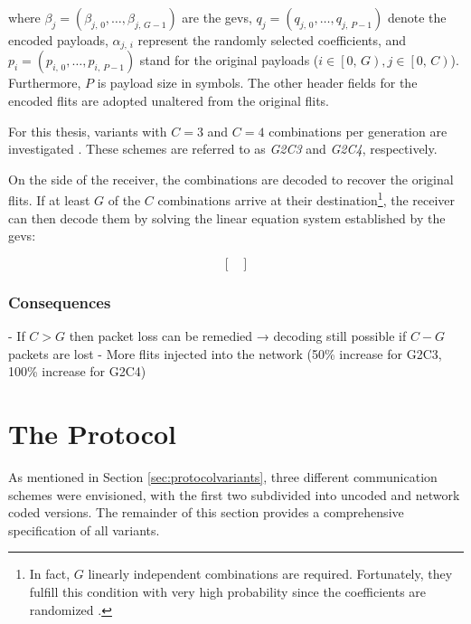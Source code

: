 where $\beta_j = (\beta_{j,\,0}, …, \beta_{j,\,G-1})$ are the \glspl{gev}, $q_j = (q_{j,\,0}, …, q_{j,\,P-1})$ denote the encoded payloads,
$\alpha_{j,\,i}$ represent the randomly selected coefficients, and $p_i = (p_{i,\,0}, …, p_{i,\,P-1})$ stand for the original payloads
($i \in \left[0,\,G\right), j \in \left[0,\,C\right)$). Furthermore, $P$ is payload size in symbols.%
The other header fields for the encoded flits are adopted unaltered from the original flits.

For this thesis, variants with $C = 3$ and $C = 4$ combinations per generation are investigated \cite[cf.][2]{moriam18activeattackers}. These schemes
are referred to as \textit{G2C3} and \textit{G2C4}, respectively.

On the side of the receiver, the combinations are decoded to recover the original flits. If at least $G$ of the $C$
combinations arrive at their destination\footnote{In fact, $G$ linearly independent combinations are required. Fortunately, they fulfill this
condition with very high probability since the coefficients are randomized \cite[3]{chou03practicalnc}.}, the receiver can then decode them by solving
the linear equation system established by the \glspl{gev}:

\begin{equation}
    \begin{bmatrix}
    \end{bmatrix}
\end{equation}


\subsubsection{Consequences}
- If $C > G$ then packet loss can be remedied → decoding still possible if $C - G$ packets are lost
- More flits injected into the network (50\% increase for G2C3, 100\% increase for G2C4)

\section{The Protocol}\label{sec:theprotocol}
As mentioned in Section \ref{sec:protocolvariants}, three different communication schemes were envisioned, with the first two subdivided into uncoded
and network coded versions. The remainder of this section provides a comprehensive specification of all variants.

